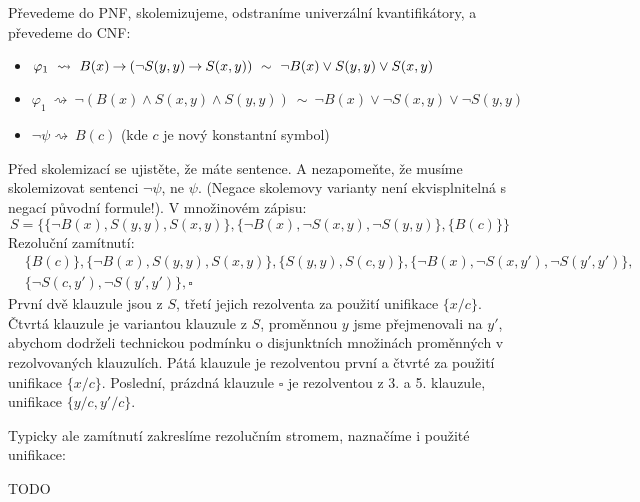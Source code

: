\begin{problem}
\begin{solution}
        Převedeme do PNF, skolemizujeme, odstraníme univerzální kvantifikátory, a převedeme do CNF:
        \begin{itemize}
            \item $\varphi_1\ \rightsquigarrow\ B(x)\limplies (\neg S(y,y)\limplies S(x,y))\ \sim \ \neg B(x)\lor S(y,y)\lor S(x,y)$
            \item $\varphi_1\ \rightsquigarrow\ \neg(B(x)\land S(x,y)\land S(y,y))\ \sim\ \neg B(x)\lor \neg S(x,y)\lor \neg S(y,y)$
            \item $\neg\psi\rightsquigarrow\ B(c)$ (kde $c$ je nový konstantní symbol)
        \end{itemize}
        Před skolemizací se ujistěte, že máte sentence. A nezapomeňte, že musíme skolemizovat sentenci $\neg\psi$, ne $\psi$. (Negace skolemovy varianty není ekvisplnitelná s negací původní formule!). V množinovém zápisu:
        $$
        S = \{\{\neg B(x), S(y,y), S(x,y)\},\{\neg B(x), \neg S(x,y), \neg S(y,y)\},\{B(c)\}\}
        $$
        Rezoluční zamítnutí:
        \begin{align*}
            &\{B(c)\},\{\neg B(x), S(y,y), S(x,y)\},\{S(y,y),S(c,y)\},\{\neg B(x), \neg S(x,y'), \neg S(y',y')\},\\
            &\{\neg S(c,y'), \neg S(y',y')\},\square    
        \end{align*}
        První dvě klauzule jsou z $S$, třetí jejich rezolventa za použití unifikace $\{x/c\}$. Čtvrtá klauzule je variantou klauzule z $S$, proměnnou $y$ jsme přejmenovali na $y'$, abychom dodrželi technickou podmínku o disjunktních množinách proměnných v rezolvovaných klauzulích. Pátá klauzule je rezolventou první a čtvrté za použití unifikace $\{x/c\}$. Poslední, prázdná klauzule $\square$ je rezolventou z 3. a 5. klauzule, unifikace $\{y/c,y'/c\}$.

        Typicky ale zamítnutí zakreslíme rezolučním stromem, naznačíme i použité unifikace:

        TODO

    \end{solution}

\end{problem}


